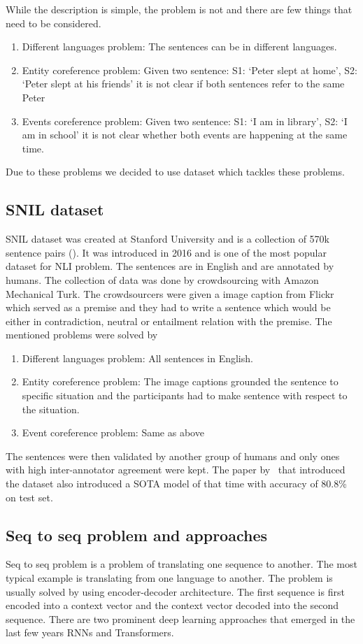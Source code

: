 \documentclass{article}
\begin{document}
    While the description is simple, the problem is not and there are few things that need to be considered.
    \begin{enumerate}
        \item Different languages problem: The sentences can be in different languages.
        \item Entity coreference problem: Given two sentence: S1: `Peter slept at home', S2: `Peter slept at his friends' it is not clear if both sentences refer to the same Peter
        \item Events coreference problem: Given two sentence: S1: `I am in library', S2: `I am in school' it is not clear whether both events are happening at the same time.
    \end{enumerate}
    Due to these problems we decided to use dataset which tackles these problems.

    \subsection{SNIL dataset}
    SNIL dataset was created at Stanford University and is a collection of 570k sentence pairs (\cite{StanfordNaturalLanguage}).
    It was introduced in 2016 and is one of the most popular dataset for NLI problem.
    The sentences are in English and are annotated by humans. The collection of data was done by crowdsourcing with Amazon Mechanical Turk.
    The crowdsourcers were given a image caption from Flickr which served as a premise and they had to write a sentence which would be either in contradiction, neutral or entailment relation with the premise.
    The mentioned problems were solved by
    \begin{enumerate}
        \item Different languages problem: All sentences in English.
        \item Entity coreference problem: The image captions grounded the sentence to specific situation and the participants had to make sentence with respect to the situation.
        \item Event coreference problem: Same as above
    \end{enumerate}
    The sentences were then validated by another group of humans and only ones with high inter-annotator agreement were kept.
    The paper by~\cite{bowmanLargeAnnotatedCorpus2015} that introduced the dataset also introduced a SOTA model of that time with accuracy of 80.8\% on test set.
    \subsection{Seq to seq problem and approaches}
    Seq to seq problem is a problem of translating one sequence to another. The most typical example is translating from one language to another.
    The problem is usually solved by using encoder-decoder architecture. The first sequence is first encoded into a context vector and the context vector decoded into the second sequence.
    There are two prominent deep learning approaches that emerged in the last few years RNNs and Transformers.
\end{document}
